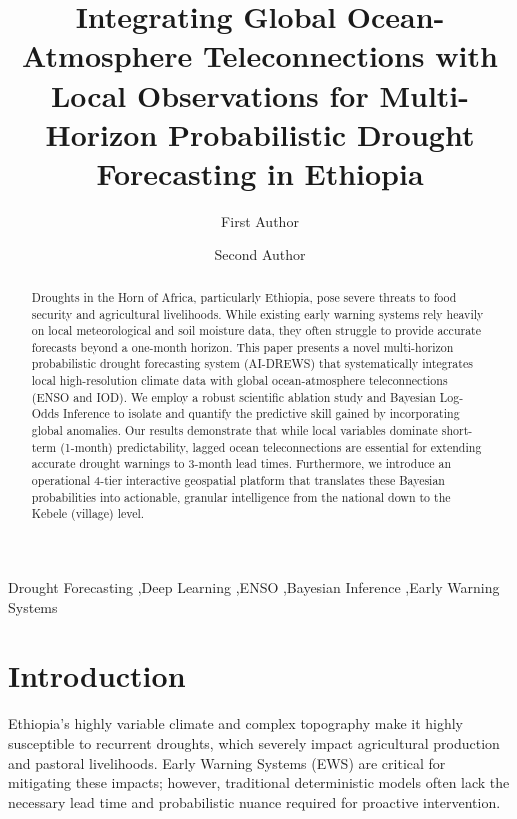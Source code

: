 \documentclass[3p,times]{elsarticle}
\begin{document}
\begin{frontmatter}

\title{Integrating Global Ocean-Atmosphere Teleconnections with Local Observations for Multi-Horizon Probabilistic Drought Forecasting in Ethiopia}

\author[1]{First Author}
\author[1]{Second Author}
\address[1]{Institution/University Name, City, Country}

\begin{abstract}
Droughts in the Horn of Africa, particularly Ethiopia, pose severe threats to food security and agricultural livelihoods. While existing early warning systems rely heavily on local meteorological and soil moisture data, they often struggle to provide accurate forecasts beyond a one-month horizon. This paper presents a novel multi-horizon probabilistic drought forecasting system (AI-DREWS) that systematically integrates local high-resolution climate data with global ocean-atmosphere teleconnections (ENSO and IOD). We employ a robust scientific ablation study and Bayesian Log-Odds Inference to isolate and quantify the predictive skill gained by incorporating global anomalies. Our results demonstrate that while local variables dominate short-term (1-month) predictability, lagged ocean teleconnections are essential for extending accurate drought warnings to 3-month lead times. Furthermore, we introduce an operational 4-tier interactive geospatial platform that translates these Bayesian probabilities into actionable, granular intelligence from the national down to the Kebele (village) level.
\end{abstract}

\begin{keyword}
Drought Forecasting \sep Deep Learning \sep ENSO \sep Bayesian Inference \sep Early Warning Systems
\end{keyword}

\end{frontmatter}

\section{Introduction}
Ethiopia’s highly variable climate and complex topography make it highly susceptible to recurrent droughts, which severely impact agricultural production and pastoral livelihoods. Early Warning Systems (EWS) are critical for mitigating these impacts; however, traditional deterministic models often lack the necessary lead time and probabilistic nuance required for proactive intervention. 
\end{document}
